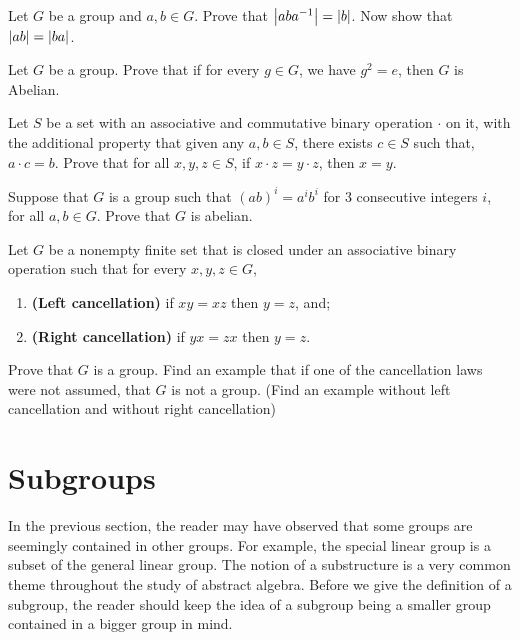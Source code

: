 \documentclass[./main.tex]{subfiles}
\begin{document}
\begin{prob}
    Let $G$ be a group and $a, b \in G$. Prove that $\abs{aba\inv} = \abs{b}$.
    Now show that $\abs{ab} = \abs{ba}$. 
\end{prob}

\begin{prob}
    Let $G$ be a group. Prove that if for every $g \in G$, we have $g^2 = e$,
    then $G$ is Abelian.
\end{prob}

\begin{prob}
    Let $S$ be a set with an associative and commutative binary operation
    $\cdot$ on it, with the additional property that given any $a, b \in S$,
    there exists $c \in S$ such that, $a \cdot c = b$. Prove that for all $x,y,z
    \in S$, if $x \cdot z = y \cdot z$, then $x = y$.
\end{prob}

\begin{prob}
    Suppose that $G$ is a group such that $(ab)^i = a^i b^i$ for 3 consecutive
    integers $i$, for all $a, b \in G$. Prove that $G$ is abelian.
\end{prob}

\begin{prob}
    Let $G$ be a nonempty finite set that is closed under an associative binary
    operation such that for every $x, y, z \in G$, 
    \begin{enumerate}
        \item \textbf{(Left cancellation)} if $xy = xz$ then $y = z$, and;
        \item \textbf{(Right cancellation)} if $yx = zx$ then $y =z$.
    \end{enumerate}
    Prove that $G$ is a group. Find an example that if one of the cancellation
    laws were not assumed, that $G$ is not a group. (Find an example without left cancellation and without right cancellation)
\end{prob}


\pagebreak
\section{Subgroups}
In the previous section, the reader may have observed that some groups are
seemingly contained in other groups. For example, the special linear group is a
subset of the general linear group. The notion of a substructure is a very
common theme throughout the study of abstract algebra. Before we give the
definition of a subgroup, the reader should keep the idea of a subgroup being a
smaller group contained in a bigger group in mind.
\end{document}
